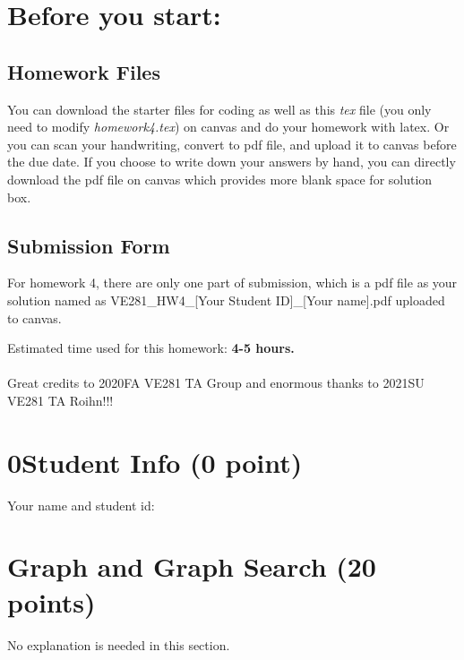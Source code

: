 \documentclass[11pt]{exam}
\begin{document}
\setlength{\parindent}{0pt}
\section*{Before you start:}

\subsection*{Homework Files}
You can download the starter files for coding as well as this \textit{tex} file (you only need to modify \textit{homework4.tex}) on canvas and do your homework with latex. Or you can scan your handwriting, convert to pdf file, and upload it to canvas before the due date. If you choose to write down your answers by hand, you can directly download the pdf file on canvas which provides more blank space for solution box.\\

\subsection*{Submission Form}
For homework 4, there are only one part of submission, which is a pdf file as your solution named as VE281\_HW4\_[Your Student ID]\_[Your name].pdf uploaded to canvas.

Estimated time used for this homework: \textbf{4-5 hours.}
\\\\
Great credits to 2020FA VE281 TA Group and enormous thanks to 2021SU VE281 TA Roihn!!!

\newpage
\section*{0\quad Student Info (0 point)}
Your name and student id:
\begin{solution}
\end{solution}

\section{Graph and Graph Search (20 points)}
No explanation is needed in this section.
\end{document}
